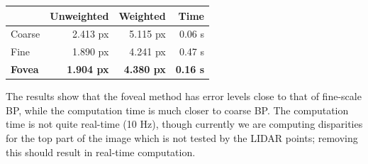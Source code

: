 \documentclass[landscape,final,a0paper,fontscale=0.32]{baposter}
\begin{document}
\begin{poster}
{      \vspace{1em}
      \begin{tabular}{|l|r|r|r|}
        \hline
        & Unweighted & Weighted & Time \\\hline
        Coarse & 2.413 px & 5.115 px & 0.06 s \\
        Fine & 1.890 px & 4.241 px & 0.47 s \\

        \textbf{Fovea} & \textbf{1.904 px} & \textbf{4.380 px} & \textbf{0.16 s}\\\hline


      \end{tabular}
      \vspace{1em}

      The results show that the foveal method has error levels close to
      that of fine-scale BP,
      while the computation time is much closer to coarse BP.
      The computation time is not quite real-time (10 Hz),
      though currently we are computing disparities for the top part
      of the image which is not tested by the LIDAR points;
      removing this should result in real-time computation.
    }



\end{poster}
\end{document}
